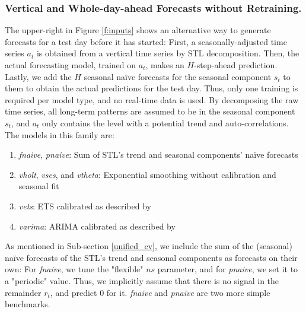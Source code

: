 \subsubsection{Vertical and Whole-day-ahead Forecasts without Retraining.}
\label{vert}

The upper-right in Figure \ref{f:inputs} shows an alternative way to
    generate forecasts for a test day before it has started:
First, a seasonally-adjusted time series $a_t$ is obtained from a vertical
    time series by STL decomposition.
Then, the actual forecasting model, trained on $a_t$, makes an $H$-step-ahead
    prediction.
Lastly, we add the $H$ seasonal na\"{i}ve forecasts for the seasonal component
    $s_t$ to them to obtain the actual predictions for the test day.
Thus, only one training is required per model type, and no real-time data is
    used.
By decomposing the raw time series, all long-term patterns are assumed to be
    in the seasonal component $s_t$, and $a_t$ only contains the level with
    a potential trend and auto-correlations.
The models in this family are:
\begin{enumerate}
\item \textit{\gls{fnaive}},
      \textit{\gls{pnaive}}:
          Sum of STL's trend and seasonal components' na\"{i}ve forecasts
\item \textit{\gls{vholt}},
      \textit{\gls{vses}}, and
      \textit{\gls{vtheta}}:
          Exponential smoothing without calibration and seasonal
                       fit
\item \textit{\gls{vets}}:
          ETS calibrated as described by \cite{hyndman2008b}
\item \textit{\gls{varima}}:
          ARIMA calibrated as described by \cite{hyndman2008a}
\end{enumerate}
As mentioned in Sub-section \ref{unified_cv}, we include the sum of the
    (seasonal) na\"{i}ve forecasts of the STL's trend and seasonal components
    as forecasts on their own:
For \textit{fnaive}, we tune the "flexible" $ns$ parameter, and for
    \textit{pnaive}, we set it to a "periodic" value.
Thus, we implicitly assume that there is no signal in the remainder $r_t$, and
    predict $0$ for it.
\textit{fnaive} and \textit{pnaive} are two more simple benchmarks.

